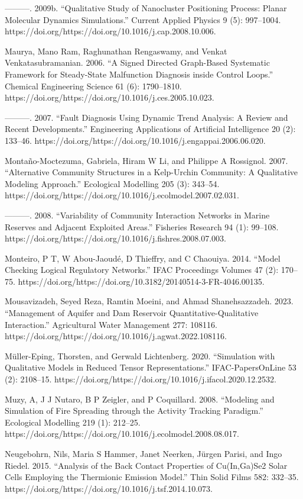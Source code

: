 \documentclass[utf8]{gradu3}
\begin{document}
———. 2009b. “Qualitative Study of Nanocluster Positioning Process: Planar Molecular Dynamics Simulations.” Current Applied Physics 9 (5): 997–1004. https://doi.org/https://doi.org/10.1016/j.cap.2008.10.006.

Maurya, Mano Ram, Raghunathan Rengaswamy, and Venkat Venkatasubramanian. 2006. “A Signed Directed Graph-Based Systematic Framework for Steady-State Malfunction Diagnosis inside Control Loops.” Chemical Engineering Science 61 (6): 1790–1810. https://doi.org/https://doi.org/10.1016/j.ces.2005.10.023.

———. 2007. “Fault Diagnosis Using Dynamic Trend Analysis: A Review and Recent Developments.” Engineering Applications of Artificial Intelligence 20 (2): 133–46. https://doi.org/https://doi.org/10.1016/j.engappai.2006.06.020.

Montaño-Moctezuma, Gabriela, Hiram W Li, and Philippe A Rossignol. 2007. “Alternative Community Structures in a Kelp-Urchin Community: A Qualitative Modeling Approach.” Ecological Modelling 205 (3): 343–54. https://doi.org/https://doi.org/10.1016/j.ecolmodel.2007.02.031.

———. 2008. “Variability of Community Interaction Networks in Marine Reserves and Adjacent Exploited Areas.” Fisheries Research 94 (1): 99–108. https://doi.org/https://doi.org/10.1016/j.fishres.2008.07.003.

Monteiro, P T, W Abou-Jaoudé, D Thieffry, and C Chaouiya. 2014. “Model Checking Logical Regulatory Networks.” IFAC Proceedings Volumes 47 (2): 170–75. https://doi.org/https://doi.org/10.3182/20140514-3-FR-4046.00135.

Mousavizadeh, Seyed Reza, Ramtin Moeini, and Ahmad Shanehsazzadeh. 2023. “Management of Aquifer and Dam Reservoir Quantitative-Qualitative Interaction.” Agricultural Water Management 277: 108116. https://doi.org/https://doi.org/10.1016/j.agwat.2022.108116.

Müller-Eping, Thorsten, and Gerwald Lichtenberg. 2020. “Simulation with Qualitative Models in Reduced Tensor Representations.” IFAC-PapersOnLine 53 (2): 2108–15. https://doi.org/https://doi.org/10.1016/j.ifacol.2020.12.2532.

Muzy, A, J J Nutaro, B P Zeigler, and P Coquillard. 2008. “Modeling and Simulation of Fire Spreading through the Activity Tracking Paradigm.” Ecological Modelling 219 (1): 212–25. https://doi.org/https://doi.org/10.1016/j.ecolmodel.2008.08.017.

Neugebohrn, Nils, Maria S Hammer, Janet Neerken, Jürgen Parisi, and Ingo Riedel. 2015. “Analysis of the Back Contact Properties of Cu(In,Ga)Se2 Solar Cells Employing the Thermionic Emission Model.” Thin Solid Films 582: 332–35. https://doi.org/https://doi.org/10.1016/j.tsf.2014.10.073.
\end{document}
